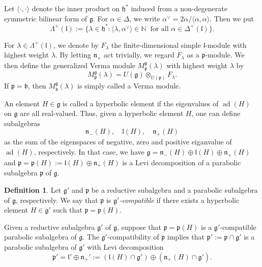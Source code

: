 \documentclass[a4paper,11pt,reqno]{amsart}
\newcommand{\frakg}{\mathfrak{g}}
\newcommand{\frakh}{\mathfrak{h}}
\newcommand{\frakn}{\mathfrak{n}}
\newcommand{\frakp}{\mathfrak{p}}
\newcommand{\0}{{\bf 0}}
\newcommand{\N}{\mathbb{N}}
\newcommand{\1}{{\bf 1}}
\DeclareMathOperator{\ad}{ad}
\newcommand{\frakb}{{\mathfrak b}}
\newcommand{\frakl}{{\mathfrak l}}
\newcommand{\Mb}{M^{\frakg}_{\frakb}}
\newcommand{\Mp}{M^{\frakg}_{\frakp}}
\theoremstyle{plain}
\theoremstyle{definition}
\newtheorem{definition}[equation]{Definition}
\numberwithin{equation}{section}
\theoremstyle{definition}
\begin{document}
Let $\langle\cdot,\cdot\rangle$ denote the inner product on $\frakh^*$ induced from 
a non-degenerate symmetric bilinear form 
of $\frakg$. For $\alpha \in \Delta$, we write 
$\alpha^\vee = 2\alpha/\langle \alpha, \alpha \rangle$.
Then we put
\begin{equation*}
\Lambda^+(\frakl):=\{\lambda \in \frakh^* : 
\langle\lambda,\alpha^\vee\rangle 
\in \N
\;\;
\text{for all $\alpha \in \Delta^+(\frakl)$\}}.
\end{equation*}

For $\lambda \in \Lambda^+(\frakl)$, we denote by $F_\lambda$ the finite-dimensional
simple $\frakl$-module with highest weight $\lambda$. By letting $\frakn_+$ act trivially,
we regard $F_\lambda$ as a $\frakp$-module. We then define the generalized Verma
module $\Mp(\lambda)$ with highest weight $\lambda$ by 
\begin{equation*}
\Mp(\lambda) =U(\frakg)\otimes_{U(\frakp)}F_{\lambda}.
\end{equation*}
If $\frakp=\frakb$, then $\Mb(\lambda)$ is simply called a Verma module.

An element $H \in \frakg$ is called a hyperbolic element if
the eigenvalues of $\ad(H)$ on $\frakg$
are all real-valued. Thus, given a hyperbolic element $H$, 
one can define
subalgebras
\begin{equation*}
\frakn_-(H),
\quad
 \frakl(H),
\quad
\frakn_+(H)
\end{equation*}
as the sum of the eigenspaces of negative, zero and positive 
eiganvalue of $\ad(H)$, respectively.
In that case, we have
$\frakg=\frakn_-(H) \oplus \frakl(H) \oplus \frakn_+(H)$
and  $\frakp = \frakp(H):=\frakl(H)\oplus \frakn_+(H)$ is a Levi decomposition
of a parabolic subalgebra $\frakp$ of $\frakg$.

\begin{definition}\label{def:compatible}
Let $\frakg'$ and $\frakp$ be
a reductive subalgebra and a parabolic subalgebra of $\frakg$, respectively.
We say that 
$\frakp$ is \emph{$\frakg'$-compatible} if there exists a hyperbolic element 
$H \in \frakg'$ such that $\frakp = \frakp(H)$.
\end{definition}

Given a reductive subalgebra $\frakg'$ of $\frakg$,
suppose that  $\frakp=\frakp(H)$ is
a $\frakg'$-compatible parabolic subalgebra of $\frakg$.
The $\frakg'$-compatibility of $\frakp$ implies that
$\frakp':=\frakp \cap \frakg'$ is a parabolic subalgebra of $\frakg'$
with Levi decomposition
\begin{equation*}
\frakp'=\frakl' \oplus \frakn_+' :=(\frakl(H)\cap \frakg') \oplus (\frakn_+(H)\cap \frakg').
\end{equation*}
\end{document}
